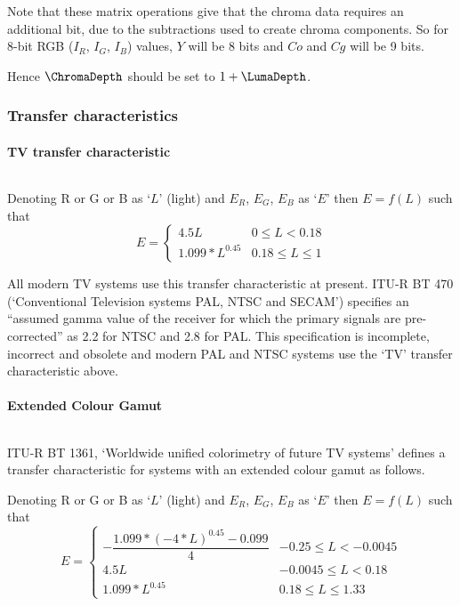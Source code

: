 \begin{informative*}
Note that these matrix operations give that the chroma data requires an additional bit, due to the subtractions used to create chroma components. 
So for 8-bit RGB ($I_R$, $I_G$, $I_B$) values, $Y$ will be 8 bits and $Co$ and
$Cg$ will be 9 bits. 

Hence $\ChromaDepth$ should be set to $1+\LumaDepth$.

\subsubsection{Transfer characteristics}
\paragraph{TV transfer characteristic}
$\ $\newline

Denoting R or G or B as `$L$' (light) and $E_R$, $E_G$, $E_B$ as
`$E$' then $E=f(L)$ such that
\[
E=\left\{
        \begin{array}{ll}
        4.5L & 0\leq L<0.18\\
        1.099*L^{0.45} &0.18\leq L \leq 1
        \end{array}
  \right.
\]

All modern TV systems use this transfer characteristic at present. ITU-R
BT 470 (`Conventional Television systems PAL, NTSC and SECAM') specifies
an ``assumed gamma value of the receiver for which the primary
signals are pre-corrected'' as 2.2 for NTSC and 2.8 for PAL. This
specification is incomplete, incorrect and obsolete and modern PAL and
NTSC systems use the `TV' transfer characteristic above.

\paragraph{Extended Colour Gamut}
$\ $\newline

ITU-R BT 1361, `Worldwide unified colorimetry of future TV systems'
defines a transfer characteristic for systems with an extended colour
gamut as follows.

Denoting R or G or B as `$L$' (light) and $E_R$, $E_G$, $E_B$ as
`$E$' then $E=f(L)$ such that
\[
E=\left\{
        \begin{array}{ll}
        -\dfrac{1.099*(-4*L)^{0.45}-0.099}{4} & -0.25\leq L<-0.0045\\
        4.5L & -0.0045\leq L<0.18\\
        1.099*L^{0.45} &0.18\leq L \leq 1.33
        

\end{array}\]
\end{informative*}
